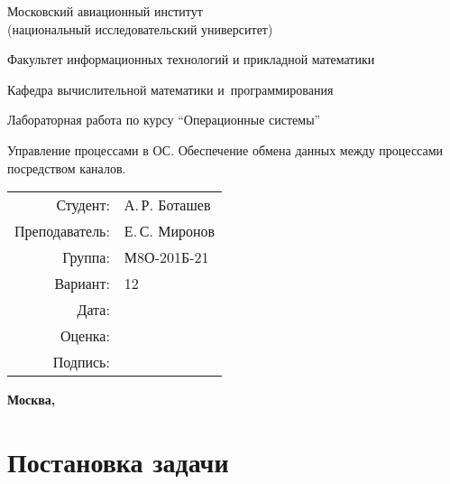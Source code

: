 \documentclass[pdf, unicode, 12pt, a4paper,oneside,fleqn]{article}
\begin{document}
\begin{titlepage}
    \begin{center}
        \bfseries

        {\Large Московский авиационный институт\\ (национальный исследовательский университет)}
        
        \vspace{48pt}
        
        {\large Факультет информационных технологий и прикладной математики}
        
        \vspace{36pt}
        
        {\large Кафедра вычислительной математики и~программирования}
        
        \vspace{48pt}
        
        Лабораторная работа  по курсу \enquote{Операционные системы}

        \vspace{48pt}

        Управление процессами в ОС. Обеспечение обмена данных между процессами посредством каналов.
    \end{center}
    
    \vspace{140pt}
    
    \begin{flushright}
    \begin{tabular}{rl}
    Студент: & А.\,Р. Боташев \\
    Преподаватель: & Е.\,С. Миронов \\
    Группа: & М8О-201Б-21 \\
    Вариант: & 12 \\
    Дата: & \\
    Оценка: & \\
    Подпись: & \\
    \end{tabular}
    \end{flushright}
    
    \vfill
    
    \begin{center}
    \bfseries
    Москва, \the\year
    \end{center}
\end{titlepage}
    
\pagebreak

\section{Постановка задачи}
\end{document}
